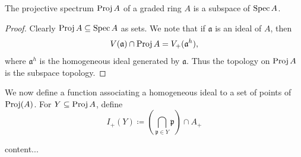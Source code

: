\begin{proposition}
	The projective spectrum $\operatorname{Proj} A$ of a graded ring $A$ is a subspace of $\operatorname{Spec} A$.
\end{proposition}
\begin{proof}
	Clearly $\operatorname{Proj} A \subseteq \operatorname{Spec} A$ as sets. We note that if $\mathfrak{a}$ is an ideal of $A$, then
	\begin{equation*}
		V(\mathfrak{a}) \cap \operatorname{Proj} A = V_+(\mathfrak{a}^h),
	\end{equation*}
	where $\mathfrak{a}^h$ is the homogeneous ideal generated by $\mathfrak{a}$. Thus the topology on $\operatorname{Proj} A$ is the subspace topology.
\end{proof}

We now define a function associating a homogeneous ideal to a set of points of $\operatorname{Proj}(A)$. For $Y \subseteq \operatorname{Proj} A$, define
\begin{equation*}
	I_+(Y) \coloneqq \left(\bigcap_{\mathfrak{p} \in Y} \mathfrak{p}\right) \cap A_+
\end{equation*}

\begin{proposition}
	content...
\end{proposition}


